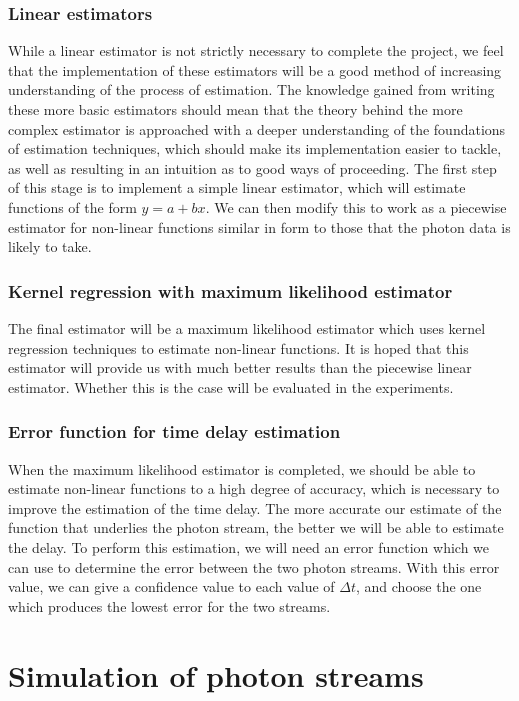 \documentclass[11pt]{article}
\begin{document}
\subsubsection{Linear estimators}
\label{sec-2.4.2}

    While a linear estimator is not strictly necessary to complete the project, we feel that the implementation of these estimators will be a good method of increasing understanding of the process of estimation. The knowledge gained from writing these more basic estimators should mean that the theory behind the more complex estimator is approached with a deeper understanding of the foundations of estimation techniques, which should make its implementation easier to tackle, as well as resulting in an intuition as to good ways of proceeding. The first step of this stage is to implement a simple linear estimator, which will estimate functions of the form $y=a+bx$. We can then modify this to work as a piecewise estimator for non-linear functions similar in form to those that the photon data is likely to take.
\subsubsection{Kernel regression with maximum likelihood estimator}
\label{sec-2.4.3}

    The final estimator will be a maximum likelihood estimator which uses kernel regression techniques to estimate non-linear functions. It is hoped that this estimator will provide us with much better results than the piecewise linear estimator. Whether this is the case will be evaluated in the experiments.
\subsubsection{Error function for time delay estimation}
\label{sec-2.4.4}

    When the maximum likelihood estimator is completed, we should be able to estimate non-linear functions to a high degree of accuracy, which is necessary to improve the estimation of the time delay. The more accurate our estimate of the function that underlies the photon stream, the better we will be able to estimate the delay. To perform this estimation, we will need an error function which we can use to determine the error between the two photon streams. With this error value, we can give a confidence value to each value of $\Delta t$, and choose the one which produces the lowest error for the two streams.
\section{Simulation of photon streams}
\label{sec-3}
\end{document}

